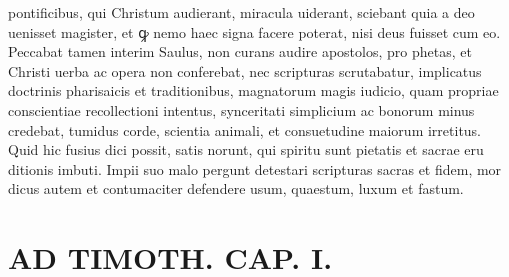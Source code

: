 \documentclass{article}
\begin{document}
\begin{pages}
pontificibus, qui Christum audierant, miracula uiderant, sciebant quia a deo uenisset magister, et ꝙ nemo haec signa facere poterat, nisi deus fuisset cum eo. Peccabat tamen interim Saulus, non curans audire apostolos, pro phetas, et Christi uerba ac opera non conferebat, nec scripturas scrutabatur, implicatus doctrinis pharisaicis et traditionibus, magnatorum magis iudicio, quam propriae conscientiae recollectioni intentus, synceritati simplicium ac bonorum minus credebat, tumidus corde, scientia animali, et consuetudine maiorum irretitus. Quid hic fusius dici possit, satis norunt, qui spiritu sunt pietatis et sacrae eru ditionis imbuti. Impii suo malo pergunt detestari scripturas sacras et fidem, mor dicus autem et contumaciter defendere usum, quaestum, luxum et fastum.  \pend
\section*{AD TIMOTH. CAP. I. }
\marginpar{[ p.475 ]}
{}

\end{pages}
\end{document}
